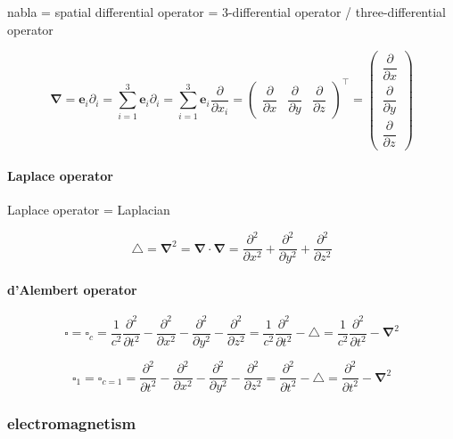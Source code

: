 \documentclass[
]{book}
\theoremstyle{definition}
\theoremstyle{definition}
\theoremstyle{definition}
\theoremstyle{definition}
\theoremstyle{remark}
\begin{document}
nabla = spatial differential operator = 3-differential operator / three-differential operator

\[
\boldsymbol{\nabla}=\boldsymbol{e}_{{\scriptscriptstyle i}}\partial_{{\scriptscriptstyle i}}=\sum_{i=1}^{3}\boldsymbol{e}_{{\scriptscriptstyle i}}\partial_{{\scriptscriptstyle i}}=\sum_{i=1}^{3}\boldsymbol{e}_{{\scriptscriptstyle i}}\dfrac{\partial}{\partial x_{{\scriptscriptstyle i}}}=\begin{pmatrix}\dfrac{\partial}{\partial x} & \dfrac{\partial}{\partial y} & \dfrac{\partial}{\partial z}\end{pmatrix}^{\intercal}=\begin{pmatrix}\dfrac{\partial}{\partial x}\\
\dfrac{\partial}{\partial y}\\
\dfrac{\partial}{\partial z}
\end{pmatrix}
\]

\paragraph{Laplace operator}\label{laplace-operator}

Laplace operator = Laplacian

\[
\triangle=\boldsymbol{\nabla}^{2}=\boldsymbol{\nabla}\cdot\boldsymbol{\nabla}=\dfrac{\partial^{2}}{\partial x^{2}}+\dfrac{\partial^{2}}{\partial y^{2}}+\dfrac{\partial^{2}}{\partial z^{2}}
\]

\paragraph{d'Alembert operator}\label{dalembert-operator}

\[
\square=\square_{{\scriptscriptstyle c}}=\dfrac{1}{c^{2}}\dfrac{\partial^{2}}{\partial t^{2}}-\dfrac{\partial^{2}}{\partial x^{2}}-\dfrac{\partial^{2}}{\partial y^{2}}-\dfrac{\partial^{2}}{\partial z^{2}}=\dfrac{1}{c^{2}}\dfrac{\partial^{2}}{\partial t^{2}}-\triangle=\dfrac{1}{c^{2}}\dfrac{\partial^{2}}{\partial t^{2}}-\boldsymbol{\nabla}^{2}
\]

\[
\square_{{\scriptscriptstyle 1}}=\square_{{\scriptscriptstyle c=1}}=\dfrac{\partial^{2}}{\partial t^{2}}-\dfrac{\partial^{2}}{\partial x^{2}}-\dfrac{\partial^{2}}{\partial y^{2}}-\dfrac{\partial^{2}}{\partial z^{2}}=\dfrac{\partial^{2}}{\partial t^{2}}-\triangle=\dfrac{\partial^{2}}{\partial t^{2}}-\boldsymbol{\nabla}^{2}
\]

\subsubsection{electromagnetism}\label{electromagnetism}
\end{document}
